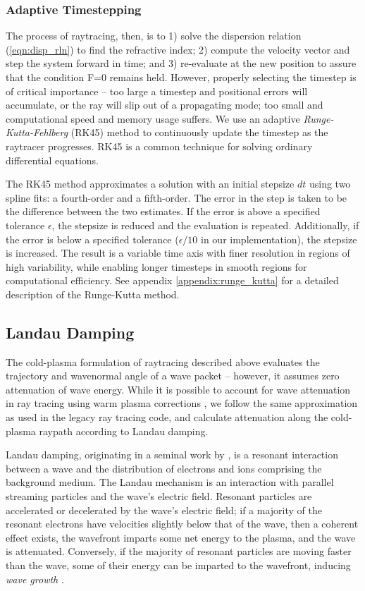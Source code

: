 \subsubsection{Adaptive Timestepping}
The process of raytracing, then, is to 1) solve the dispersion relation (\ref{eqn:disp_rln}) to find the refractive index; 2) compute the velocity vector and step the system forward in time; and 3) re-evaluate at the new position to assure that the condition F=0 remains held. However, properly selecting the timestep is of critical importance -- too large a timestep and positional errors will accumulate, or the ray will slip out of a propagating mode; too small and computational speed and memory usage suffers. We use an adaptive \emph{Runge-Kutta-Fehlberg} (RK45) \citep{Fehlberg1969, Mathews2004} method to continuously update the timestep as the raytracer progresses. RK45 is a common technique for solving ordinary differential equations.

The RK45 method approximates a solution with an initial stepsize $dt$ using two spline fits: a fourth-order and a fifth-order. The error in the step is taken to be the difference between the two estimates. If the error is above a specified tolerance $\epsilon$, the stepsize is reduced and the evaluation is repeated. Additionally, if the error is below a specified tolerance ($\epsilon/10$ in our implementation), the stepsize is increased. The result is a variable time axis with finer resolution in regions of high variability, while enabling longer timesteps in smooth regions for computational efficiency. See appendix \ref{appendix:runge_kutta} for a detailed description of the Runge-Kutta method.

\subsection{Landau Damping}
The cold-plasma formulation of raytracing described above evaluates the trajectory and wavenormal angle of a wave packet -- however, it assumes zero attenuation of wave energy. While it is possible to account for wave attenuation in ray tracing using warm plasma corrections \citep{Sazhin1993, Henyey1980}, we follow the same approximation as used in the legacy ray tracing code, and calculate attenuation along the cold-plasma raypath according to Landau damping.

Landau damping, originating in a seminal work by \cite{Landau1946}, is a resonant interaction between a wave and the distribution of electrons and ions comprising the background medium. The Landau mechanism is an interaction with parallel streaming particles and the wave's electric field. Resonant particles are accelerated or decelerated by the wave's electric field; if a majority of the resonant electrons have velocities slightly below that of the wave, then a coherent effect exists, the wavefront imparts some net energy to the plasma, and the wave is attenuated. Conversely, if the majority of resonant particles are moving faster than the wave, some of their energy can be imparted to the wavefront, inducing \emph{wave growth} \citep{Chen1983, Kulkarni2009}. 

